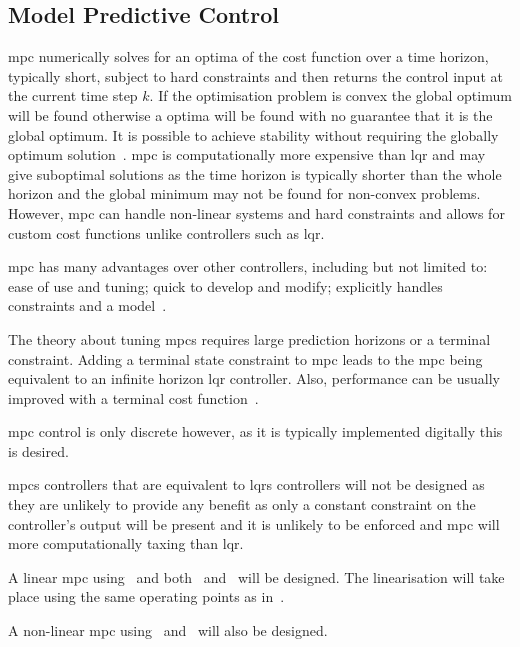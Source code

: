 \subsection{Model Predictive Control}

\gls{mpc} numerically solves for an optima of the cost function over a time horizon, typically short, subject to hard constraints and then returns the control input at the current time step $k$. 
If the optimisation problem is convex the global optimum will be found otherwise a optima will be found with no guarantee that it is the global optimum.
It is possible to achieve stability without requiring the globally optimum solution~\cite{Gor2004}.
\gls{mpc} is computationally more expensive than \gls{lqr} and may give suboptimal solutions as the time horizon is typically shorter than the whole horizon and the global minimum may not be found for non-convex problems.
However, \gls{mpc} can handle non-linear systems and hard constraints and allows for custom cost functions unlike controllers such as \gls{lqr}. 

\gls{mpc} has many advantages over other controllers, including but not limited to: ease of use and tuning; quick to develop and modify; explicitly handles constraints and a model~\cite{Raw2017}.

The theory about tuning \glspl{mpc} requires large prediction horizons or a terminal constraint.
Adding a terminal state constraint to \gls{mpc} leads to the \gls{mpc} being equivalent to an infinite horizon \gls{lqr} controller.
Also, performance can be usually improved with a terminal cost function~\cite{Gor2004}.

\gls{mpc} control is only discrete however, as it is typically implemented digitally this is desired. 

\glspl{mpc} controllers that are equivalent to \glspl{lqr} controllers will not be designed as they are unlikely to provide any benefit as only a constant constraint on the controller's output will be present and it is unlikely to be enforced and \gls{mpc} will more computationally taxing than \gls{lqr}.

A linear \gls{mpc} using~ and both~ and~ will be designed.
The linearisation will take place using the same operating points as in~.

A non-linear \gls{mpc} using~ and~ will also be designed.